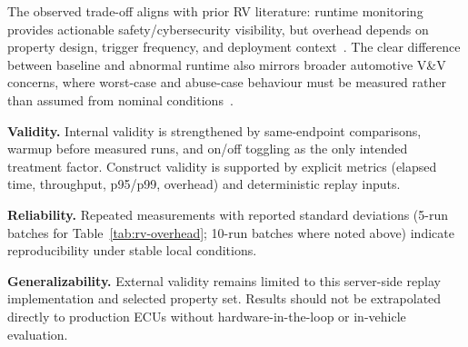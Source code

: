 The observed trade-off aligns with prior RV literature: runtime monitoring provides actionable safety/cybersecurity visibility, but overhead depends on property design, trigger frequency, and deployment context~\cite{krichen2023survey,zhang2024context,jaksic2018algebraic}. The clear difference between baseline and abnormal runtime also mirrors broader automotive V\&V concerns, where worst-case and abuse-case behaviour must be measured rather than assumed from nominal conditions~\cite{ekert2021cybersecurity}.

\textbf{Validity.} Internal validity is strengthened by same-endpoint comparisons, warmup before measured runs, and on/off toggling as the only intended treatment factor. Construct validity is supported by explicit metrics (elapsed time, throughput, p95/p99, overhead) and deterministic replay inputs.

\textbf{Reliability.} Repeated measurements with reported standard deviations (5-run batches for Table~\ref{tab:rv-overhead}; 10-run batches where noted above) indicate reproducibility under stable local conditions.

\textbf{Generalizability.} External validity remains limited to this server-side replay implementation and selected property set. Results should not be extrapolated directly to production ECUs without hardware-in-the-loop or in-vehicle evaluation.